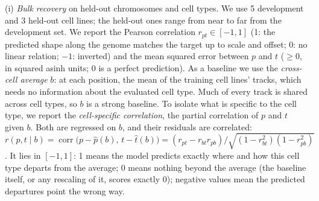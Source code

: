 \documentclass[acmtog]{acmart}
\begin{document}
(i) \emph{Bulk recovery} on held-out chromosomes and cell types. We use 5 development and 3 held-out cell lines; the held-out ones range from near to far from the development set. We report the Pearson correlation $r_{pt}\in[-1,1]$ (1: the predicted shape along the genome matches the target up to scale and offset; 0: no linear relation; $-1$: inverted) and the mean squared error between $p$ and $t$ ($\ge0$, in squared asinh units; 0 is a perfect prediction). As a baseline we use the \emph{cross-cell average} $b$: at each position, the mean of the training cell lines' tracks, which needs no information about the evaluated cell type. Much of every track is shared across cell types, so $b$ is a strong baseline. To isolate what is specific to the cell type, we report the \emph{cell-specific correlation}, the partial correlation of $p$ and $t$ given $b$. Both are regressed on $b$, and their residuals are correlated: $r(p,t\mid b)=\operatorname{corr}\big(p-\hat p(b),\,t-\hat t(b)\big)=(r_{pt}-r_{bt}r_{pb})/\sqrt{(1-r_{bt}^2)(1-r_{pb}^2)}$. It lies in $[-1,1]$: 1 means the model predicts exactly where and how this cell type departs from the average; 0 means nothing beyond the average (the baseline itself, or any rescaling of it, scores exactly 0); negative values mean the predicted departures point the wrong way.
\end{document}

